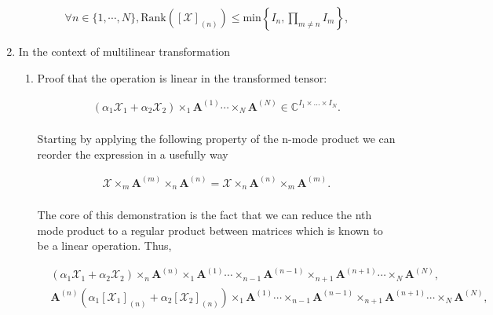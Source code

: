 \documentclass[a4paper,10pt]{article}
\begin{document}
\begin{enumerate}
        \begin{align}
            \forall n \in \{1, \cdots, N\}, \text{Rank} \left( \left[\mathcal{X}\right]_{(n)} \right) \leq \text{min} \left\{ I_{n}, \prod_{m \neq n} I_{m} \right\},
        \end{align}
        
    \item In the context of multilinear transformation
        
        \begin{enumerate}
           
            \item Proof that the operation is linear in the transformed tensor:
            
                \begin{align}
                    (\alpha_{1} \mathcal{X}_{1} + \alpha_{2} \mathcal{X}_{2}) \times_{1} \boldsymbol{A}^{(1)} \cdots \times_{N} \boldsymbol{A}^{(N)} \in \mathbb{C}^{I_{1} \times ... \times I_{N}}.
                \end{align}
                
                \paragraph{}Starting by applying the following property of the n-mode product we can reorder the expression in a usefully way
                
                \begin{align}
                    \mathcal{X} \times_{m} \boldsymbol{A}^{(m)} \times_{n} \boldsymbol{A}^{(n)} = \mathcal{X} \times_{n} \boldsymbol{A}^{(n)} \times_{m} \boldsymbol{A}^{(m)}. 
                \end{align}
                
                \paragraph{}The core of this demonstration is the fact that we can reduce the nth mode product to a regular product between matrices which is known to be a linear operation. Thus, 
                
                \begin{align}
                    &(\alpha_{1} \mathcal{X}_{1} + \alpha_{2} \mathcal{X}_{2}) \times_{n} \boldsymbol{A}^{(n)} \times_{1} \boldsymbol{A}^{(1)} \cdots \times_{n-1} \boldsymbol{A}^{(n-1)} \times_{n+1} \boldsymbol{A}^{(n+1)} \cdots \times_{N} \boldsymbol{A}^{(N)}, \\
                    &\boldsymbol{A}^{(n)} \left( \alpha_{1} \left[\mathcal{X}_{1}\right]_{(n)} +  \alpha_{2} \left[\mathcal{X}_{2}\right]_{(n)} \right) \times_{1} \boldsymbol{A}^{(1)} \cdots \times_{n-1} \boldsymbol{A}^{(n-1)} \times_{n+1} \boldsymbol{A}^{(n+1)} \cdots \times_{N} \boldsymbol{A}^{(N)},
                \end{align}
                

\end{enumerate}
\end{enumerate}
\end{document}
